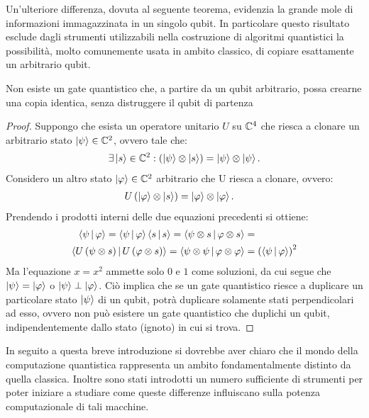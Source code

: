 Un'ulteriore differenza, dovuta al seguente teorema, evidenzia la grande mole di informazioni immagazzinata in un singolo qubit.
In particolare questo risultato esclude dagli strumenti utilizzabili nella costruzione di algoritmi quantistici la possibilità, molto comunemente usata in ambito classico, di copiare esattamente un arbitrario qubit.
\begin{thm}\label{thm:N-C}
 Non esiste un gate quantistico che, a partire da un qubit arbitrario, possa crearne una copia identica, senza distruggere il qubit di partenza
\end{thm}
\newpage
\begin{proof}
 Suppongo che esista un operatore unitario $U$ su $\mathbb{C}^{4}$ che riesca a clonare un arbitrario stato $\ket{\psi} \in \mathbb{C}^{2}$, ovvero tale che: 
 \begin{align}
  \exists \ket{s} \in \mathbb{C}^{2} : \left(\ket{\psi} \otimes \ket{s} \right) = \ket{\psi} \otimes \ket{\psi}.
 \end{align}
 Considero un altro stato $\ket{\varphi} \in \mathbb{C}^{2}$ arbitrario che U riesca a clonare, ovvero:
 \begin{align}
  U \left(\ket{\varphi} \otimes \ket{s} \right) &= \ket{\varphi} \otimes \ket{\varphi}.
 \end{align}
 Prendendo i prodotti interni delle due equazioni precedenti si ottiene:
 \begin{align}
  \braket{\psi\,}{\, \varphi} = \braket{\psi\,}{\, \varphi}\braket{s\,}{\, s} = \braket{\psi \otimes s\,}{\, \varphi \otimes s} &=\\
  \braket{U \left(\psi \otimes s \right)\,}{\, U \left(\varphi \otimes s \right)} = \braket{\psi \otimes \psi\,}{\, \varphi \otimes \varphi} &= \left( \braket{\psi\,}{\, \varphi} \right)^2
 \end{align}
 Ma l'equazione $x = x^2$ ammette solo $0$ e $1$ come soluzioni, da cui segue che $\ket{\psi} = \ket{\varphi}$ o $\ket{\psi} \perp \ket{\varphi}$. Ciò implica che se un gate quantistico riesce a duplicare un particolare stato $\ket{\psi}$ di un qubit, potrà duplicare solamente stati perpendicolari ad esso, ovvero non può esistere un gate quantistico che duplichi un qubit, indipendentemente dallo stato (ignoto) in cui si trova.
\end{proof}

In seguito a questa breve introduzione si dovrebbe aver chiaro che il mondo della computazione quantistica rappresenta un ambito fondamentalmente distinto da quella classica. 
Inoltre sono stati introdotti un numero sufficiente di strumenti per poter iniziare a studiare come queste differenze influiscano sulla potenza computazionale di tali macchine.
